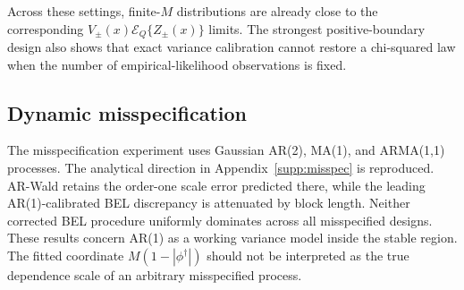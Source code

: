 \documentclass[12pt]{article}
\theoremstyle{remark}
\begin{document}
\begin{table}[htbp]
\centering
\scriptsize
\caption{Fixed-$Q$ variance-calibrated boundary results with $Q=20$. Coverage and the 95\% quantile ratio are averaged across the four block lengths. The coverage range records the minimum and maximum across $M$. The failure column is the largest convex-hull failure rate.}
\label{tab:boundary-vc}
\end{table}

Across these settings, finite-$M$ distributions are already close to the corresponding $V_\pm(x)\mathcal E_Q\{Z_\pm(x)\}$ limits. The strongest positive-boundary design also shows that exact variance calibration cannot restore a chi-squared law when the number of empirical-likelihood observations is fixed.

\subsection{Dynamic misspecification}
The misspecification experiment uses Gaussian AR(2), MA(1), and ARMA(1,1) processes. The analytical direction in Appendix~\ref{supp:misspec} is reproduced. AR-Wald retains the order-one scale error predicted there, while the leading AR(1)-calibrated BEL discrepancy is attenuated by block length. Neither corrected BEL procedure uniformly dominates across all misspecified designs. These results concern AR(1) as a working variance model inside the stable region. The fitted coordinate $M(1-|\phi^\dagger|)$ should not be interpreted as the true dependence scale of an arbitrary misspecified process.
\end{document}
